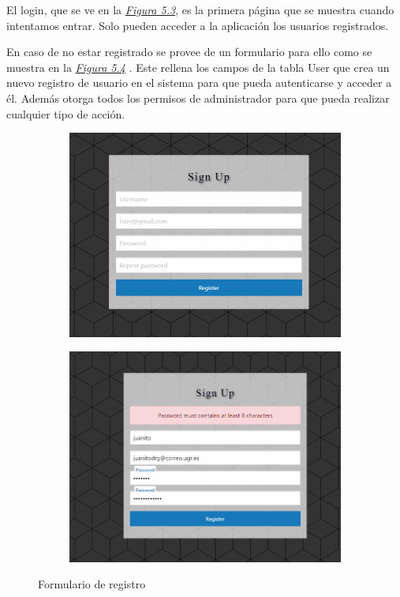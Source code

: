 El login, que se ve en la \textit{\hyperref[fig:login]{Figura 5.3}}, es la primera página que se muestra cuando intentamos entrar. Solo pueden acceder a la aplicación los usuarios registrados.

En caso de no estar registrado se provee de un formulario para ello como se muestra en la \textit{\hyperref[fig:general]{Figura 5.4}} . Este rellena los campos de la tabla User que crea un nuevo registro de usuario en el sistema para que pueda autenticarse y acceder a él. Además otorga todos los permisos de administrador para que pueda realizar cualquier tipo de acción. \vspace{1cm}


\begin{figure}[!ht]
  \centering
  \begin{subfigure}{0.7\textwidth}
    \includegraphics[width=\linewidth]{imagenes/register.png}
    \label{fig:imagen1}
  \end{subfigure}
  \hfill
  \begin{subfigure}{0.7\textwidth}
    \includegraphics[width=\linewidth]{imagenes/register2.png}
    \label{fig:imagen2}
  \end{subfigure}

  \caption{Formulario de registro}
  \label{fig:general}
\end{figure}\vspace{2cm}


